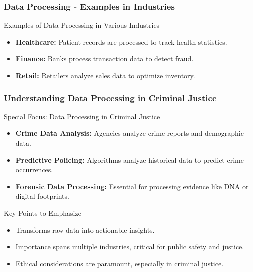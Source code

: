 \documentclass[aspectratio=169]{beamer}
\begin{document}
\begin{frame}[fragile]
    \frametitle{Data Processing - Examples in Industries}
    \begin{block}{Examples of Data Processing in Various Industries}
        \begin{itemize}
            \item \textbf{Healthcare:}
                Patient records are processed to track health statistics.
                
            \item \textbf{Finance:}
                Banks process transaction data to detect fraud.
                
            \item \textbf{Retail:}
                Retailers analyze sales data to optimize inventory.
        \end{itemize}
    \end{block}
\end{frame}

\begin{frame}[fragile]
    \frametitle{Understanding Data Processing in Criminal Justice}
    \begin{block}{Special Focus: Data Processing in Criminal Justice}
        \begin{itemize}
            \item \textbf{Crime Data Analysis:}
                Agencies analyze crime reports and demographic data.
                
            \item \textbf{Predictive Policing:}
                Algorithms analyze historical data to predict crime occurrences.
                
            \item \textbf{Forensic Data Processing:}
                Essential for processing evidence like DNA or digital footprints.
        \end{itemize}
    \end{block}
    \begin{block}{Key Points to Emphasize}
        \begin{itemize}
            \item Transforms raw data into actionable insights.
            \item Importance spans multiple industries, critical for public safety and justice.
            \item Ethical considerations are paramount, especially in criminal justice.
        \end{itemize}
    \end{block}
\end{frame}
\end{document}
